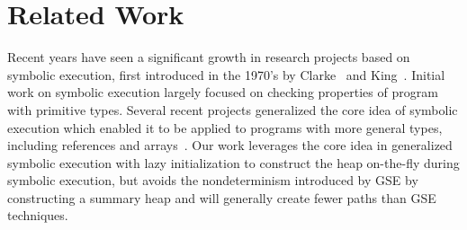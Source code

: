 \section{Related Work}
\label{related}


Recent years have seen a significant growth in research projects based
on symbolic execution, first introduced in the 1970's by
Clarke~\cite{Clarke:76} and King~\cite{King:76}. Initial work on symbolic
execution largely focused on checking properties of program with
primitive types. Several recent projects generalized the core
idea of symbolic execution which enabled it to be applied to
programs with more general types, including references and 
arrays~\cite{GSE03,Godefroid:PLDI05,Sen:FSE05,CadarEngler05EXE,KiasanKunit}.
Our work leverages the core idea in generalized symbolic execution
with lazy initialization to construct the heap on-the-fly during symbolic
execution, but avoids the nondeterminism introduced by GSE by
constructing a summary heap and will generally create fewer paths
than GSE techniques.



